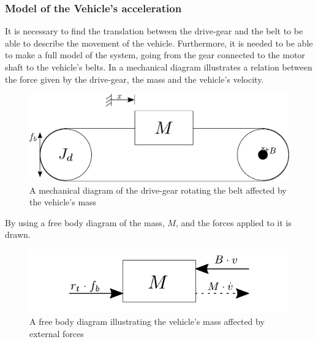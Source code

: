 \subsubsection{Model of the Vehicle's acceleration}\label{BeltModel}
It is necessary to find the translation between the drive-gear and the belt to be able to describe the movement of the vehicle. Furthermore, it is needed to be able to make a full model of the system, going from the gear connected to the motor shaft to the vehicle's belts. In  a mechanical diagram illustrates a relation between the force given by the drive-gear, the mass and the vehicle's velocity.

\begin{figure}[H]
	\centering
	\includegraphics[scale=0.8]{figures/mechanicalDrawingBelt.pdf}
	\caption{A mechanical diagram of the drive-gear rotating the belt affected by the vehicle's mass}
	\label{fig:BeltMechanicalDiagram}
\end{figure}

By using  a free body diagram of the mass, $M$, and the forces applied to it is drawn.

\begin{figure}[H]
	\centering
	\includegraphics[scale=1]{figures/freeBodyBelt.pdf}
	\caption{A free body diagram illustrating the vehicle's mass affected by external forces}
	\label{fig:BeltFreeBodyDiagram}
\end{figure}

